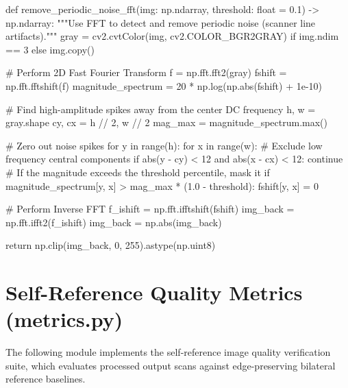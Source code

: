 \begin{tcblisting}
def remove_periodic_noise_fft(img: np.ndarray, threshold: float = 0.1) -> np.ndarray:
    """Use FFT to detect and remove periodic noise (scanner line artifacts)."""
    gray = cv2.cvtColor(img, cv2.COLOR_BGR2GRAY) if img.ndim == 3 else img.copy()

    # Perform 2D Fast Fourier Transform
    f = np.fft.fft2(gray)
    fshift = np.fft.fftshift(f)
    magnitude_spectrum = 20 * np.log(np.abs(fshift) + 1e-10)

    # Find high-amplitude spikes away from the center DC frequency
    h, w = gray.shape
    cy, cx = h // 2, w // 2
    mag_max = magnitude_spectrum.max()

    # Zero out noise spikes
    for y in range(h):
        for x in range(w):
            # Exclude low frequency central components
            if abs(y - cy) < 12 and abs(x - cx) < 12:
                continue
            # If the magnitude exceeds the threshold percentile, mask it
            if magnitude_spectrum[y, x] > mag_max * (1.0 - threshold):
                fshift[y, x] = 0

    # Perform Inverse FFT
    f_ishift = np.fft.ifftshift(fshift)
    img_back = np.fft.ifft2(f_ishift)
    img_back = np.abs(img_back)

    return np.clip(img_back, 0, 255).astype(np.uint8)
\end{tcblisting}

\section{Self-Reference Quality Metrics (metrics.py)}

The following module implements the self-reference image quality verification suite, which evaluates processed output scans against edge-preserving bilateral reference baselines.

